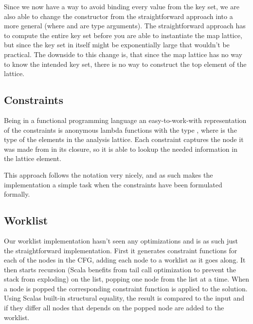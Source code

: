 Since we now have a way to avoid binding every value from the key set, we are also able to change the constructor from the straightforward approach  into a more general  (where  and  are type arguments). The straightforward approach has to compute the entire key set before you are able to instantiate the map lattice, but since the key set in itself might be exponentially large that wouldn't be practical. The downside to this change is, that since the map lattice has no way to know the intended key set, there is no way to construct the top element of the lattice.


\subsection{Constraints}

Being in a functional programming language an easy-to-work-with representation of the constraints is anonymous lambda functions with the type , where  is the type of the elements in the analysis lattice. Each constraint captures the node it was made from in its closure, so it is able to lookup the needed information in the lattice element.

This approach follows the notation very nicely, and as such makes the implementation a simple task when the constraints have been formulated formally.

\subsection{Worklist}
Our worklist implementation hasn't seen any optimizations and is as such just the straightforward implementation. First it generates constraint functions for each of the nodes in the CFG, adding each node to a worklist as it goes along. It then starts recursion (Scala benefits from tail call optimization to prevent the stack from exploding) on the list, popping one node from the list at a time. When a node is popped the corresponding constraint function is applied to the solution. Using Scalas built-in structural equality, the result is compared to the input and if they differ all nodes that depends on the popped node are added to the worklist.

